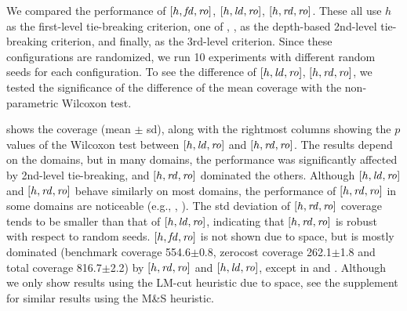 We compared the performance of
$[h,\mbox{\textit{fd}},\mbox{\textit{ro}}]$, $[h,\mbox{\textit{ld}},\mbox{\textit{ro}}]$, $[h,\mbox{\textit{rd}},\mbox{\textit{ro}}]$. These all use 
$h$ as the first-level tie-breaking criterion, one of \fd, \ld, \rd as
the depth-based 2nd-level tie-breaking criterion, and finally,
\ro as the 3rd-level criterion.
Since these configurations are randomized, we run 10
experiments with different random seeds for each configuration.
To see the difference of $[h,\mbox{\textit{ld}},\mbox{\textit{ro}}]$, $[h,\mbox{\textit{rd}},\mbox{\textit{ro}}]$,
we tested the significance of the difference of the mean coverage with 
the non-parametric Wilcoxon test.   %

 shows the coverage (mean $\pm$ sd),
along with the rightmost columns showing the $p$ values of the
Wilcoxon test between $[h,\mbox{\textit{ld}},\mbox{\textit{ro}}]$ and $[h,\mbox{\textit{rd}},\mbox{\textit{ro}}]$.
The results depend on the domains, but in many domains,
the performance was significantly affected by 2nd-level tie-breaking, and
$[h,\mbox{\textit{rd}},\mbox{\textit{ro}}]$ dominated the others. 
Although $[h, \mbox{\textit{ld}}, \mbox{\textit{ro}}]$ and $[h,\mbox{\textit{rd}},\mbox{\textit{ro}}]$ behave similarly on most domains, 
the performance of $[h,\mbox{\textit{rd}},\mbox{\textit{ro}}]$ in some
domains are noticeable (e.g., , ). 
The std deviation of $[h,\mbox{\textit{rd}},\mbox{\textit{ro}}]$ coverage tends to be smaller
than that of $[h,\mbox{\textit{ld}},\mbox{\textit{ro}}]$, indicating that $[h,\mbox{\textit{rd}},\mbox{\textit{ro}}]$ is robust with respect to random seeds.
$[h,\mbox{\textit{fd}},\mbox{\textit{ro}}]$ is not shown due to space, but is mostly dominated (benchmark
coverage 554.6$\pm$0.8, zerocost coverage 262.1$\pm$1.8 and total
coverage 816.7$\pm$2.2) by $[h,\mbox{\textit{rd}},\mbox{\textit{ro}}]$ and $[h,\mbox{\textit{ld}},\mbox{\textit{ro}}]$, except in 
and .
Although we only show results using the LM-cut heuristic due to space, see the supplement for similar results using the M\&S heuristic.


